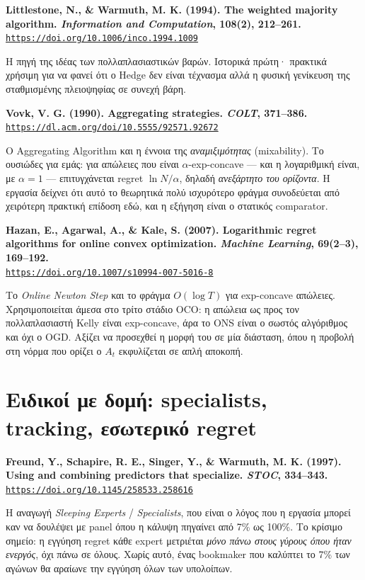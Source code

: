 \documentclass[11pt,a4paper]{article}
\newcommand{\en}[1]{\textenglish{#1}}
\newcommand{\src}[3]{%
  \par\medskip\noindent\textbf{#2}\\
  \href{#3}{\texttt{\small #3}}\par\smallskip}
\begin{document}
\src{littlestone1994}{Littlestone, N., \& Warmuth, M. K. (1994). The weighted majority
algorithm. \emph{Information and Computation}, 108(2), 212--261.}
{https://doi.org/10.1006/inco.1994.1009}
Η πηγή της ιδέας των πολλαπλασιαστικών βαρών. Ιστορικά πρώτη· πρακτικά χρήσιμη για να
φανεί ότι ο Hedge δεν είναι τέχνασμα αλλά η φυσική γενίκευση της σταθμισμένης πλειοψηφίας
σε συνεχή βάρη.

\src{vovk1990}{Vovk, V. G. (1990). Aggregating strategies. \emph{COLT}, 371--386.}
{https://dl.acm.org/doi/10.5555/92571.92672}
Ο Aggregating Algorithm και η έννοια της \emph{αναμιξιμότητας} (\en{mixability}). Το
ουσιώδες για εμάς: για απώλειες που είναι $\alpha$-exp-concave --- και η λογαριθμική είναι,
με $\alpha=1$ --- επιτυγχάνεται regret $\ln N / \alpha$, δηλαδή \emph{ανεξάρτητο του
ορίζοντα}. Η εργασία δείχνει ότι αυτό το θεωρητικά πολύ ισχυρότερο φράγμα συνοδεύεται από
χειρότερη πρακτική επίδοση εδώ, και η εξήγηση είναι ο στατικός comparator.

\src{hazan2007}{Hazan, E., Agarwal, A., \& Kale, S. (2007). Logarithmic regret algorithms for
online convex optimization. \emph{Machine Learning}, 69(2--3), 169--192.}
{https://doi.org/10.1007/s10994-007-5016-8}
Το \emph{Online Newton Step} και το φράγμα $O(\log T)$ για exp-concave απώλειες.
Χρησιμοποιείται άμεσα στο τρίτο στάδιο OCO: η απώλεια ως προς τον πολλαπλασιαστή Kelly είναι
exp-concave, άρα το ONS είναι ο σωστός αλγόριθμος και όχι ο OGD. Αξίζει να προσεχθεί η μορφή
του σε μία διάσταση, όπου η προβολή στη νόρμα που ορίζει ο $A_t$ εκφυλίζεται σε απλή αποκοπή.

\section{Ειδικοί με δομή: specialists, tracking, εσωτερικό regret}

\src{freund1997}{Freund, Y., Schapire, R. E., Singer, Y., \& Warmuth, M. K. (1997). Using and
combining predictors that specialize. \emph{STOC}, 334--343.}
{https://doi.org/10.1145/258533.258616}
Η αναγωγή \emph{Sleeping Experts} / \emph{Specialists}, που είναι ο λόγος που η εργασία
μπορεί καν να δουλέψει με panel όπου η κάλυψη πηγαίνει από 7\% ως 100\%. Το κρίσιμο σημείο:
η εγγύηση regret κάθε expert μετριέται \emph{μόνο πάνω στους γύρους όπου ήταν ενεργός}, όχι
πάνω σε όλους. Χωρίς αυτό, ένας bookmaker που καλύπτει το 7\% των αγώνων θα αραίωνε την
εγγύηση όλων των υπολοίπων.
\end{document}
